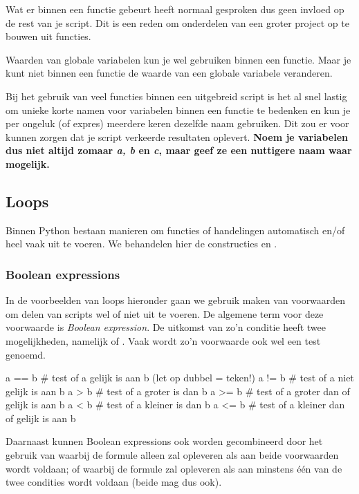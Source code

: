 \documentclass[a4paper,11pt, fleqn]{article}
\begin{document}
Wat er binnen een functie gebeurt heeft normaal gesproken dus geen invloed op de rest van je script. Dit is een reden om onderdelen van een groter project op te bouwen uit functies.

Waarden van globale variabelen kun je wel gebruiken binnen een functie. Maar je kunt niet binnen een functie de waarde van een globale variabele veranderen.

Bij het gebruik van veel functies binnen een uitgebreid script is het al snel lastig om unieke korte namen voor variabelen binnen een functie te bedenken en kun je per ongeluk (of expres) meerdere keren dezelfde naam gebruiken. Dit zou er voor kunnen zorgen dat je script verkeerde resultaten oplevert. {\bf Noem je variabelen dus niet altijd zomaar \textit{a, b} en \textit{c}, maar geef ze een nuttigere naam waar mogelijk.}

\subsection{Loops}
Binnen Python bestaan manieren om functies of handelingen automatisch en/of heel vaak uit te voeren. We behandelen hier de constructies  en .

\subsubsection{Boolean expressions}
In de voorbeelden van loops hieronder gaan we gebruik maken van voorwaarden om delen van scripts wel of niet uit te voeren. De algemene term voor deze voorwaarde is \textit{Boolean expression}. De uitkomst van zo'n conditie heeft twee mogelijkheden, namelijk  of . Vaak wordt zo'n voorwaarde ook wel een test genoemd.

\begin{python}
a == b	# test of a gelijk is aan b (let op dubbel = teken!)
a != b	# test of a niet gelijk is aan b
a > b	# test of a groter is dan b
a >= b	# test of a groter dan of gelijk is aan b
a < b	# test of a kleiner is dan b
a <= b	# test of a kleiner dan of gelijk is aan b
\end{python}

Daarnaast kunnen Boolean expressions ook worden gecombineerd door het gebruik van  waarbij de formule alleen   zal opleveren als aan beide voorwaarden wordt voldaan; of  waarbij de formule  zal opleveren als aan minstens \'e\'en van de twee condities wordt voldaan (beide mag dus ook).
\end{document}
